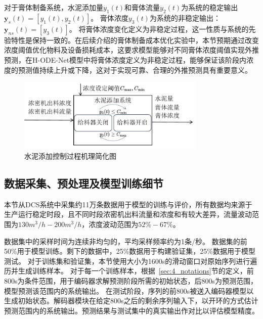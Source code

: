 对于膏体制备系统，水泥添加量$y_1(t)$和膏体流量$y_2(t)$为系统的稳定输出$\boldsymbol y_s(t)=[y_1(t), y_2(t)]$。
膏体浓度$y_3(t)$为系统的非稳定输出：$\boldsymbol y_{ns}(t)=[y_3(t)]$。
将膏体浓度变化定义为非稳定过程，这一性质与系统的先验特性是保持一致的。在后续介绍的膏体制备成本优化实验中，本节预期通过改变浓度阈值优化物料及设备损耗成本，这要求模型能够对不同膏体浓度阈值实现外推预测，在H-ODE-Net模型中将膏体浓度定义为非稳定过程，能够保证该阶段内浓度的预测值持续上升或下降，这对于实现可靠、合理的外推预测具有重要意义。
\begin{figure}[h]
    \centering
    \includegraphics[width=0.8\textwidth]{figures/chapter4/add_cement_workloop.pdf}
  \caption{水泥添加控制过程机理简化图}
  \label{fig:add_cement_workloop} 
\end{figure}


\subsection{数据采集、预处理及模型训练细节}

本节从DCS系统中采集约11万条数据用于模型的训练与评价，所有数据均来源于生产运行稳定时段，且不同时段浓密机出料流量和浓度和有较大差异，流量波动范围为$130m^3/h-200m^3/h$，浓度波动范围为$52\%-67\%$。

数据集中的采样时间为连续非均匀的，平均采样频率约为1条/秒。
数据集的前50\%用于模型训练。剩下的数据中，25\%数据用于构建验证集，25\%数据用于模型测试。
对于训练集和验证集，本节使用大小为1600s的滑动窗口对原始序列进行遍历并生成训练样本。
对于每一个训练样本，根据~\ref{sec:4_notations}节的定义，前800s为条件范围，用于编码器求解预测阶段所需的初始状态，后800s为预测范围，模型预测该范围内的系统输出。
在测试阶段，序列的前800s被送入编码器模型以生成初始状态。解码器模块在给定800s之后的剩余序列输入下，以开环的方式估计预测范围内的系统输出。预测结果与测试集中的真实输出作对比以评估模型精度。

